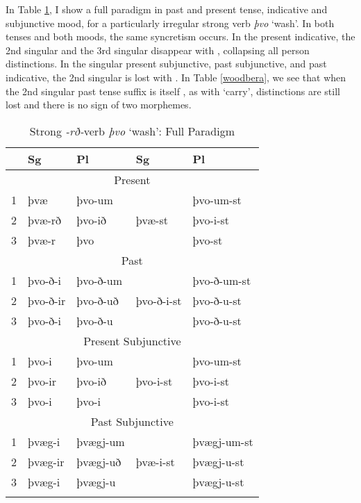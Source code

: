 \documentclass[output=paper]{langscibook}
\begin{document}
In Table \ref{woodwash}, I show a full paradigm in past and present tense, indicative and subjunctive mood, for a particularly irregular strong verb \textit{þvo} `wash'. In both tenses and both moods, the same syncretism occurs. In the present indicative, the 2nd singular  and the 3rd singular  disappear with \stin, collapsing all person distinctions. In the singular present subjunctive, past subjunctive, and past indicative, the 2nd singular  is lost with \stin. In Table \ref{woodbera}, we see that when the 2nd singular past tense suffix is itself \stin, as with  `carry', distinctions are still lost and there is no sign of two \sti morphemes.

\begin{table}
\caption{Strong \textit{-rð-}verb \textit{þvo} `wash': Full Paradigm} \label{woodwash}

\begin{tabular}{*5{l}}
\lsptoprule
  & {Sg} & {Pl}  & {Sg} & {Pl} \\\midrule
\multicolumn{5}{c}{Present} \\\midrule
1 & þvæ & þvo-um  	&  			&  þvo-um-st \\
2 & þvæ-rð & þvo-ið 		& þvæ-st 	&  þvo-i-st  \\
3 & þvæ-r  & þvo 		& 		& þvo-st  \\\midrule
\multicolumn{5}{c}{Past} \\\midrule
1 & þvo-ð-i & þvo-ð-um  	&  			&  þvo-ð-um-st \\
2 & þvo-ð-ir & þvo-ð-uð 		& þvo-ð-i-st 	&  þvo-ð-u-st  \\
3 & þvo-ð-i  & þvo-ð-u 		& 		& þvo-ð-u-st  \\\midrule
\multicolumn{5}{c}{Present Subjunctive} \\\midrule
1 & þvo-i & þvo-um  	&  			&  þvo-um-st \\
2 & þvo-ir & þvo-ið 		& þvo-i-st 	&  þvo-i-st  \\
3 & þvo-i  & þvo-i 		& 		& þvo-i-st  \\\midrule
\multicolumn{5}{c}{Past Subjunctive} \\\midrule
1 & þvæg-i & þvægj-um  	&  			&  þvægj-um-st \\
2 & þvæg-ir & þvægj-uð 		& þvæ-i-st 	&  þvægj-u-st  \\
3 & þvæg-i  & þvægj-u 		& 		& þvægj-u-st  \\
\lspbottomrule
\end{tabular}
\end{table}
\end{document}
